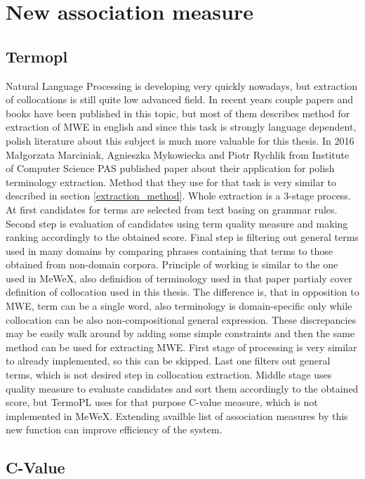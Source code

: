 \chapter{New association measure}


\section{Termopl}
Natural Language Processing is developing very quickly nowadays, but extraction of collocations is still quite low advanced field. 
In recent years couple papers and books have been published in this topic, but most of them describes method for extraction of MWE in english 
and since this task is strongly language dependent, polish literature about this subject is much more valuable for this thesis.
In 2016 Małgorzata Marciniak, Agnieszka Mykowiecka and Piotr Rychlik from Institute of Computer Science PAS published paper about their application 
for polish terminology extraction. Method that they use for that task is very similar to described in section \ref{extraction_method}. 
Whole extraction is a 3-stage process. At first candidates for terms are selected from text basing on grammar rules. 
Second step is evaluation of candidates using term quality measure and making ranking accordingly to the obtained score. 
Final step is filtering out general terms used in many domains by comparing phrases containing that terms to those obtained from non-domain corpora.
Principle of working is similar to the one used in MeWeX, also definidion of terminology used in that paper 
partialy cover definition of collocation used in this thesis. The difference is, that in opposition to MWE, term can be a single word, 
also terminology is domain-specific only while collocation can be also non-compositional general expression. 
These discrepancies may be easily walk around by adding some simple constraints and then the same method can be used for extracting MWE. 
First stage of processing is very similar to already implemented, so this can be skipped. Last one filters out general terms, 
which is not desired step in collocation extraction. Middle stage uses quality measure to evaluate candidates and sort them 
accordingly to the obtained score, but TermoPL uses for that purpose C-value measure, which is not implemented in MeWeX. 
Extending availble list of association measures by this new function can improve efficiency of the system.

\section{C-Value}

